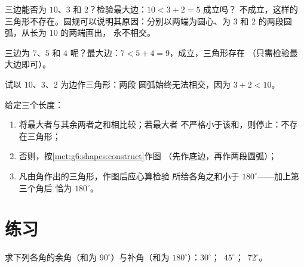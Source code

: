 \begin{example}\label{ex:g7:triangles:inequality}
三边能否为 $10$、$3$ 和 $2$？检验最大边：$10 < 3 + 2 = 5$ 成立吗？
不成立，这样的三角形不存在。圆规可以说明其原因：分别以两端为圆心、为
$3$ 和 $2$ 的两段圆弧，从长为 $10$ 的两端画出，
永不相交。

三边为 $7$、$5$ 和 $4$ 呢？最大边：$7 < 5 + 4 = 9$，成立，三角形存在
（只需检验最大边即可）。
\end{example}

\begin{omfigure}

{\small 试以 $10$、$3$、$2$ 为边作三角形：两段
圆弧始终无法相交，因为 $3 + 2 < 10$。}
\end{omfigure}

\begin{method}[三角形的存在性与作图]\label{met:g7:triangles:construct}
给定三个长度：
\begin{enumerate}
  \item 将最大者与其余两者之和相比较；若最大者
        不严格小于该和，则停止：不存在三角形；
  \item 否则，按\cref{met:g6:shapes:construct}作图
        （先作底边，再作两段圆弧）；
  \item 凡由角作出的三角形，作图后应心算检验
        所给各角之和小于 $180^\circ$——加上第三个角后
        恰为 $180^\circ$。
\end{enumerate}
\end{method}

\section{练习}

\begin{exercise}[$\star$]\label{exo:g7:triangles:1}
求下列各角的余角（和为 $90^\circ$）与补角（和为
$180^\circ$）：$30^\circ$；\ $45^\circ$；\ $72^\circ$。
\end{exercise}

